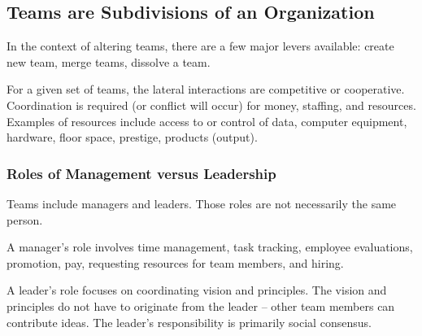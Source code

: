 

\subsection{Teams are Subdivisions of an Organization}

\cite{2015_Katzenbach}

In the context of altering teams, there are a few major levers available: create new team, merge teams, dissolve a team. 

For a given set of teams, the lateral interactions are competitive or cooperative. Coordination is required (or conflict will occur) for money, staffing, and resources. Examples of resources include access to or control of data, computer equipment, hardware, floor space, prestige, products (output).

\subsubsection{Roles of Management versus Leadership}

Teams include managers and leaders. Those roles are not necessarily the same person. 

A manager's role involves time management, task tracking, employee evaluations, promotion, pay, requesting resources for team members, and hiring. 

A leader's role focuses on coordinating vision and principles. The vision and principles do not have to originate from the leader -- other team members can contribute ideas. The leader's responsibility is primarily social consensus. 